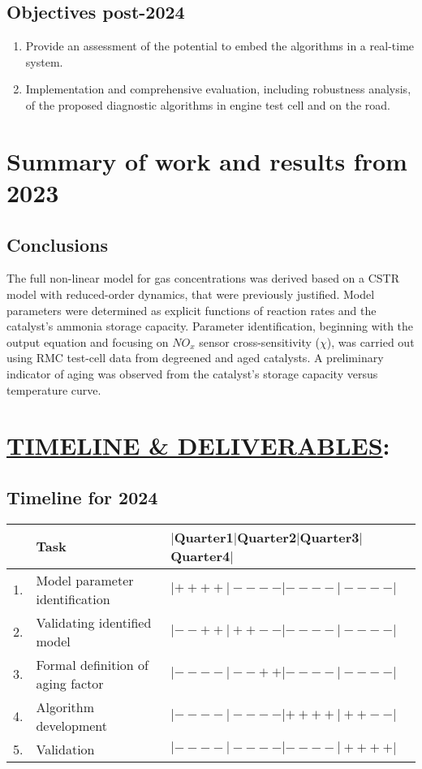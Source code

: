 \subsection{Objectives post-2024}
\begin{enumerate}
    \item Provide an assessment of the potential to embed the algorithms in a real-time system.
    \item Implementation and comprehensive evaluation, including robustness analysis, of the proposed diagnostic algorithms in engine test cell and on the road.
\end{enumerate}



\section{Summary of work and results from 2023}

\subsection{Conclusions}
The full non-linear model for gas concentrations was derived based on a CSTR
model with reduced-order dynamics, that were previously justified. Model
parameters were determined as explicit functions of reaction rates and the
catalyst's ammonia storage capacity.  Parameter identification, beginning with
the output equation and focusing on $NO_x$ sensor cross-sensitivity ($\chi$),
was carried out using RMC test-cell data from degreened and aged catalysts. A
preliminary indicator of aging was observed from the catalyst's storage capacity
versus temperature curve.

\section{\underline{TIMELINE & DELIVERABLES}:}
\subsection{Timeline for 2024}

\begin{table}[H]
    \centering
    \begin{tabular}{l l l}
        \hline\hline
                & Task & $|$Quarter1$|$Quarter2$|$Quarter3$|$Quarter4$|$ \\\hline\hline
        1.      & Model parameter identification   & $|++++|----|----|----|$\\
        2.      & Validating identified model      & $|--++|++--|----|----|$\\
        3.      & Formal definition of aging factor& $|----|--++|----|----|$\\
        4.      & Algorithm development            & $|----|----|++++|++--|$\\
        5.      & Validation                       & $|----|----|----|++++|$\\
        \hline\hline
    \end{tabular}
\end{table}

